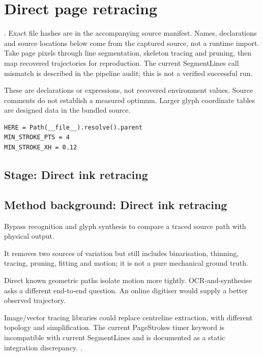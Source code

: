 \chapter{Direct page retracing}\label{module:retrace}
. Exact file hashes are in the accompanying source manifest. Names, declarations and source locations below come from the captured source, not a runtime import.
Take page pixels through line segmentation, skeleton tracing and pruning, then map recovered trajectories for reproduction. The current SegmentLines call mismatch is described in the pipeline audit; this is not a verified successful run.


These are declarations or expressions, not recovered environment values. Source comments do not establish a measured optimum. Larger glyph coordinate tables are designed data in the bundled source.
\begin{lstlisting}[style=plain]
HERE = Path(__file__).resolve().parent
MIN_STROKE_PTS = 4
MIN_STROKE_XH = 0.12
\end{lstlisting}
\section*{Stage: Direct ink retracing}
\section{Method background: Direct ink retracing}\label{method:retrace}
Bypass recognition and glyph synthesis to compare a traced source path with physical output.


It removes two sources of variation but still includes binarisation, thinning, tracing, pruning, fitting and motion; it is not a pure mechanical ground truth.


Direct known geometric paths isolate motion more tightly. OCR-and-synthesise asks a different end-to-end question. An online digitiser would supply a better observed trajectory.


Image/vector tracing libraries could replace centreline extraction, with different topology and simplification. The current PageStrokes timer keyword is incompatible with current SegmentLines and is documented as a static integration discrepancy. \cite{code2026,zhangsuen1984,douglaspeucker1973}.


